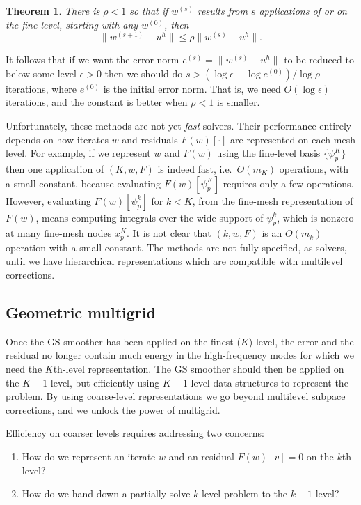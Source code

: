 \documentclass[letterpaper,final,12pt,reqno]{amsart}
\theoremstyle{claim}
\newtheorem*{theorem}{Theorem}
\newcommand{\eps}{\epsilon}
\numberwithin{equation}{section}
\numberwithin{figure}{section}
\numberwithin{table}{section}
\begin{document}
\begin{theorem} \cite[Theorem 3.10]{GraeserKornhuber2009}  There is $\rho<1$ so that if $w^{(s)}$  results from $s$ applications of  or  on the fine level, starting with any $w^{(0)}$, then
\begin{equation}
  \|w^{(s+1)} - u^h\| \le \rho \|w^{(s)} - u^h\|.  \label{eq:mscconvergence}
\end{equation}
\end{theorem}

It follows that if we want the error norm $e^{(s)} = \|w^{(s)}-u^h\|$ to be reduced to below some level $\eps>0$ then we should do $s>(\log\eps - \log e^{(0)})/\log \rho$ iterations, where $e^{(0)}$ is the initial error norm.  That is, we need $O(\log\eps)$ iterations, and the constant is better when $\rho<1$ is smaller.

Unfortunately, these  methods are not yet \emph{fast} solvers.  Their performance entirely depends on how iterates $w$ and residuals $F(w)[\cdot]$ are represented on each mesh level.  For example, if we represent $w$ and $F(w)$ using the fine-level basis $\{\psi_p^K\}$ then one application of $(K,w,F)$ is indeed fast, i.e.~$O(m_K)$ operations, with a small constant, because evaluating $F(w)[\psi_p^K]$ requires only a few operations.  However, evaluating $F(w)[\psi_p^k]$ for $k<K$, from the fine-mesh representation of $F(w)$, means computing integrals over the wide support of $\psi_p^k$, which is nonzero at many fine-mesh nodes $x_p^K$.  It is not clear that $(k,w,F)$ is an $O(m_k)$ operation with a small constant.  The  methods are not fully-specified, as solvers, until we have hierarchical representations which are compatible with multilevel corrections.

\subsection*{Geometric multigrid}  Once the GS smoother has been applied on the finest ($K$) level, the error and the residual no longer contain much energy in the high-frequency modes for which we need the $K$th-level representation.  The GS smoother should then be applied on the $K-1$ level, but efficiently using $K-1$ level data structures to represent the problem.  By using coarse-level representations we go beyond multilevel subpace corrections, and we unlock the power of multigrid.

Efficiency on coarser levels requires addressing two concerns:
\renewcommand{\labelenumi}{\emph{\roman{enumi})}}
\begin{enumerate}
\item How do we represent an iterate $w$ and an residual $F(w)[v]=0$ on the $k$th level?
\item How do we hand-down a partially-solve $k$ level problem to the $k-1$ level?
\end{enumerate}
\end{document}
